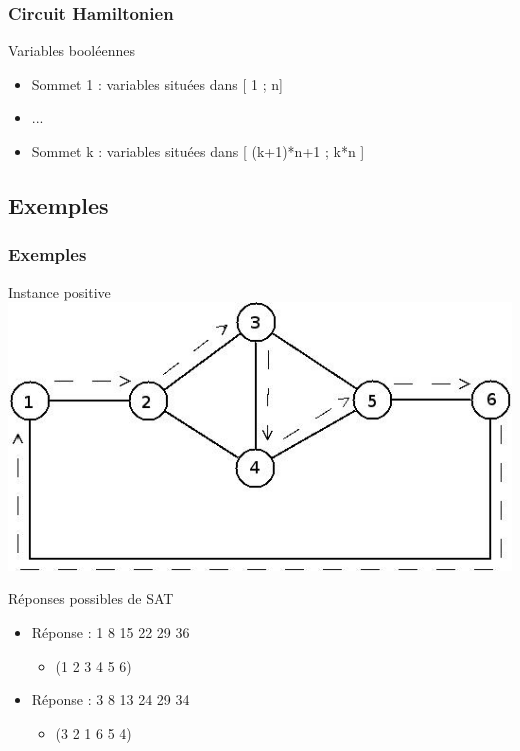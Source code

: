 \begin{frame}
\frametitle{Circuit Hamiltonien}
\begin{block}{Variables bool\'eennes}
  \begin{itemize}
  \item Sommet 1 : variables situ\'ees dans [ 1 ; n]
  \item ...
  \item Sommet k : variables situ\'ees dans [ (k+1)*n+1 ; k*n ]
  \end{itemize}
\end{block}
\end{frame}

\subsection{Exemples}

\begin{frame}
\frametitle{Exemples}
\begin{block}{Instance positive}
\includegraphics[scale=0.3]{positif.jpeg}
\end{block}
\begin{block}{R\'eponses possibles de SAT}
  \begin{itemize}
  \item R\'eponse : 1 8 15 22 29 36
    \begin{itemize}
    \item (1 2 3 4 5 6)
    \end{itemize}
  \end{itemize}
 \begin{itemize}
  \item R\'eponse : 3 8 13 24 29 34
    \begin{itemize}
    \item (3 2 1 6 5 4)
    \end{itemize}
  \end{itemize}
\end{block}
\end{frame}

